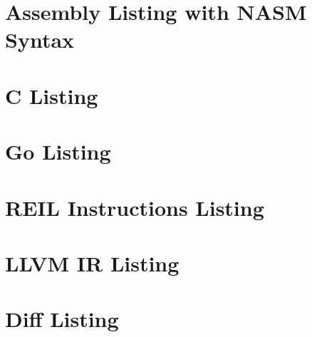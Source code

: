 \documentclass[12pt, a4paper]{article}
\begin{document}
\section{Assembly Listing with NASM Syntax}



\pagebreak

\section{C Listing}



\pagebreak

\section{Go Listing}



\pagebreak

\section{REIL Instructions Listing}



\pagebreak

\section{LLVM IR Listing}



\pagebreak

\section{Diff Listing}


\end{document}

